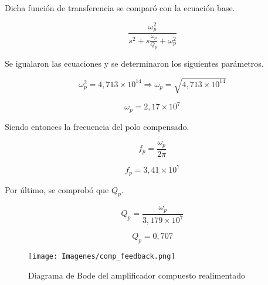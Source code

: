 \documentclass[12pt,A4paper,titlepage]{article}
\begin{document}
\bigskip
\hspace{1mm} Dicha función de transferencia se comparó con la ecuación base.

\begin{equation}
    \frac{\omega _p^2}{s^2 + s \frac{\omega _p}{Q_p } + \omega_p^2}
\end{equation}  

\bigskip
\hspace{1mm} Se igualaron las ecuaciones y se determinaron los siguientes parámetros.

\begin{equation}
    \omega _p ^2 = 4,713 \times 10^14 \Longrightarrow \omega_p =\sqrt{4,713 \times 10^14} 
\end{equation}

\begin{equation}
    \boxed{
        \omega_p = 2,17 \times 10^7
    }
\end{equation}

\bigskip
\hspace{1mm} Siendo entonces la frecuencia del polo compensado.

\begin{equation}
    f_p = \frac{\omega_p}{2\pi}
\end{equation}

\begin{equation}
    \boxed{
    f_p = 3,41\times 10^7
    }
\end{equation}

\bigskip
\hspace{1mm} Por último, se comprobó que \( Q_p \).

\begin{equation}
    Q_p = \frac{\omega_p}{3,179 \times 10^7}
\end{equation}

\begin{equation}
    \boxed{
    Q_p = 0,707
    }
\end{equation}


\begin{figure}[!h]
    \centering
    \texttt{[image: Imagenes/comp\_feedback.png]}
    \caption{Diagrama de Bode del amplificador compuesto realimentado}
\end{figure}
\end{document}
